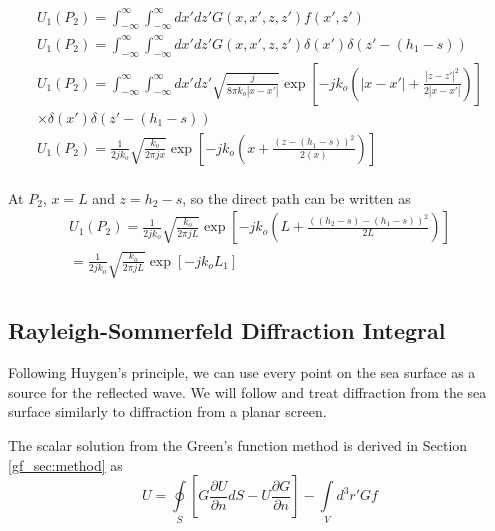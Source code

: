\begin{equation}
\begin{gathered}
U_1(P_2) = \int_{-\infty}^{\infty} \int_{-\infty}^{\infty}dx' dz' G\left(x,x',z,z' \right) f(x',z') \\
U_1(P_2) = \int_{-\infty}^{\infty} \int_{-\infty}^{\infty}dx' dz' G\left(x,x',z,z' \right)\delta(x') \delta(z'- (h_1-s)) \\
U_1(P_2) = \int_{-\infty}^{\infty} \int_{-\infty}^{\infty}dx' dz' \sqrt{\frac{j}{8\pi k_o|x-x'|}}\exp\left[-jk_o\left(|x -x'| + \frac{|z-z'|^2}{2|x-x'|}\right) \right] \\
\times \delta(x') \delta(z'- (h_1-s)) \\
U_1(P_2) = \frac{1}{2jk_o}\sqrt{\frac{k_o}{2\pi jx}}\exp\left[-jk_o\left(x + \frac{(z-(h_1-s))^2}{2(x)}\right) \right]\\
\end{gathered}
\label{mp_eq:11ab}
\end{equation}
\renewcommand{\baselinestretch}{2} \small\normalsize

At $P_2$, $x = L$ and $z = h_2-s$, so the direct path can be written as
\begin{equation}
\begin{gathered}
U_1(P_2) = \frac{1}{2jk_o}\sqrt{\frac{k_o}{2\pi jL}}\exp\left[-jk_o\left(L + \frac{((h_2-s)-(h_1-s))^2}{2L}\right) \right]\\
=\frac{1}{2jk_o} \sqrt{\frac{k_o}{2\pi jL}}\exp\left[-jk_oL_1 \right]\\
\end{gathered}
\label{mp_eq:11ac}
\end{equation}
\renewcommand{\baselinestretch}{2} \small\normalsize

\subsection{Rayleigh-Sommerfeld Diffraction Integral}
Following Huygen's principle, we can use every point on the sea surface as a source for the reflected wave. We will follow \cite{goodman_fourier} and treat diffraction from the sea surface similarly to diffraction from a planar screen. 

The scalar solution from the Green's function method is derived in Section \ref{gf_sec:method} as
\begin{equation}
U = \oint\limits_{S}\left[G\frac{\partial U}{\partial n}dS - U\frac{\partial G}{\partial n} \right] -\int\limits_{V}d^3r' Gf
\label{mp_eq:11aaa}
\end{equation}
\renewcommand{\baselinestretch}{2} \small\normalsize

